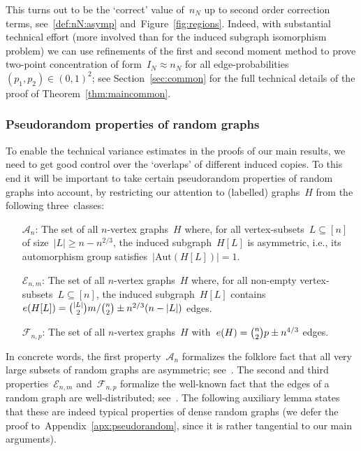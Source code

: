 \documentclass{article}
\newcommand{\cA}{\mathcal{A}}
\newcommand{\cE}{\mathcal{E}}
\newcommand{\cF}{\mathcal{F}}
\newcommand{\Aut}{\mathrm{Aut}}
\newcommand{\refT}[1]{Theorem~\ref{#1}}
\newcommand{\refS}[1]{Section~\ref{#1}}
\newcommand{\refA}[1]{Appendix~\ref{#1}}
\begin{document}
This turns out to be the `correct' value of~$n_N$ up to second order correction terms, see~\eqref{def:nN:asymp} and~Figure~\ref{fig:regions}. 
Indeed, with substantial technical effort (more involved than for the induced subgraph isomorphism problem) 
we can use refinements of the first and second moment method to prove two-point concentration of form~${I_N \approx n_N}$ 
for all edge-probabilities~${(p_1,p_2) \in (0,1)^2}$; 
see \refS{sec:common} for the full technical details of the proof of \refT{thm:maincommon}. 





\subsubsection{Pseudorandom properties of random graphs}\label{sec:pseudorandom}To enable the technical variance estimates in the proofs of our main results, we need to get good control over the `overlaps' of different induced copies. 
To this end it will be important to take certain pseudorandom properties of random graphs into account, 
by restricting our attention to (labelled) graphs~$H$ from the following three~classes:{\begin{itemize}[leftmargin=4em]
\itemsep 0.125em \parskip 0em  \partopsep=0pt \parsep 0em 
\item[$\cA_n$:]The set of all $n$-vertex graphs~$H$ where, for all vertex-subsets~${L\subseteq [n]}$ of size~${|L| \ge n-n^{2/3}}$, the induced subgraph~$H[L]$ is asymmetric, i.e., 
its automorphism group satisfies~${|\Aut(H[L])|=1}$. 
\item[$\cE_{n,m}$:]The set of all $n$-vertex graphs~$H$ where, for all non-empty vertex-subsets~${L\subseteq [n]}$,  the induced  subgraph~$H[L]$ contains $e(H[L])=\tbinom{|L|}{2}m/\tbinom{n}{2} \pm n^{2/3}(n-|L|)$ edges.
\item[$\cF_{n,p}$:]The set of all $n$-vertex graphs~$H$ with~$e(H)=\tbinom{n}{2}p \pm n^{4/3}$ edges. 
\end{itemize}}In concrete words, the first property~$\cA_n$ formalizes the folklore fact that all very large subsets of random graphs are asymmetric; see~\cite{BB,ER1963,kim2002asymmetry}.
The second and third properties~$\cE_{n,m}$ and~$\cF_{n,p}$ formalize the well-known fact that the edges of a random graph are well-distributed; see~\cite{balister2019dense,BB,FKM2014}.
The following auxiliary lemma states that these are indeed typical properties of dense random graphs 
(we defer the proof to~\refA{apx:pseudorandom}, since it is rather tangential to our main arguments). 
\end{document}
